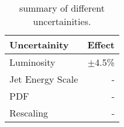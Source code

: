 \begin{table}[h!]
\begin{center}
\begin{tabular}{|l|r|}
\hline
{\bf Uncertainity } & {\bf Effect} \\
\hline     
Luminosity          &  $\pm$4.5\%  \\
Jet Energy Scale    &  	-	\\
PDF                 &	-	\\
Rescaling           &	-	\\
\hline
\end{tabular}
\caption{summary of different uncertainities.}
   \label{Table:widths}
\end{center}
\end{table}
